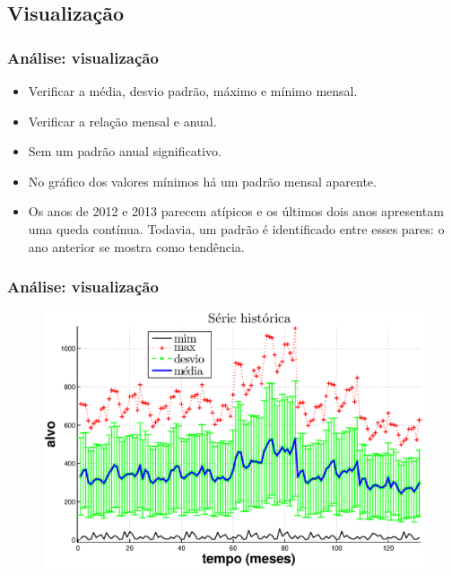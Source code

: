 \documentclass[xcolor=dvipsnames,xcolor=table]{beamer}
\begin{document}
\subsection{Visualização}
\begin{frame}\frametitle{Análise: visualização}

\begin{itemize}
\item Verificar a média, desvio padrão, máximo e mínimo mensal.
\item Verificar a relação mensal e anual.
\item Sem um padrão anual significativo.
\item No gráfico dos valores mínimos há um padrão mensal aparente.
\item Os anos de 2012 e 2013 parecem atípicos e os últimos dois anos apresentam uma queda contínua. Todavia, um padrão é identificado entre esses pares: o ano anterior se mostra como tendência.
\end{itemize}
\end{frame}

\begin{frame}\frametitle{Análise: visualização}
\begin{figure}[htpb] \begin{center} 
\includegraphics[width=0.9\columnwidth]{seriehist}
\end{center}
\end{figure}
\end{frame}
\end{document}
